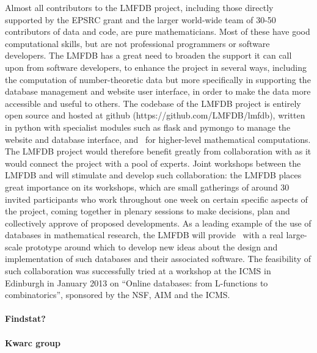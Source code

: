Almost all contributors to the LMFDB project, including those directly
supported by the EPSRC grant and the larger world-wide team of 30-50
contributors of data and code, are pure mathematicians.  Most of these
have good computational skills, but are not professional programmers
or software developers.  The LMFDB has a great need to broaden the
support it can call upon from software developers, to enhance the
project in several ways, including the computation of number-theoretic
data but more specifically in supporting the database management and
website user interface, in order to make the data more accessible and
useful to others.  The codebase of the LMFDB project is entirely open
source and hosted at github (https://github.com/LMFDB/lmfdb), written
in python with specialist modules such as flask and pymongo to manage
the website and database interface, and \Sage\ for higher-level
mathematical computations.  The LMFDB project would therefore benefit
greatly from collaboration with \TheProject as it would connect the
project with a pool of experts.  Joint workshops between the LMFDB and
\TheProject will stimulate and develop such collaboration: the LMFDB
places great importance on its workshops, which are small gatherings
of around 30 invited participants who work throughout one week on
certain specific aspects of the project, coming together in plenary
sessions to make decisions, plan and collectively approve of proposed
developments.  As a leading example of the use of databases in
mathematical research, the LMFDB will provide \TheProject\ with a real
large-scale prototype around which to develop new ideas about the
design and implementation of such databases and their associated
software.  The feasibility of such collaboration was successfully
tried at a workshop at the ICMS in Edinburgh in January 2013 on
``Online databases: from L-functions to combinatorics'', sponsored by
the NSF, AIM and the ICMS.

\paragraph{Findstat?}

\paragraph{Kwarc group}


